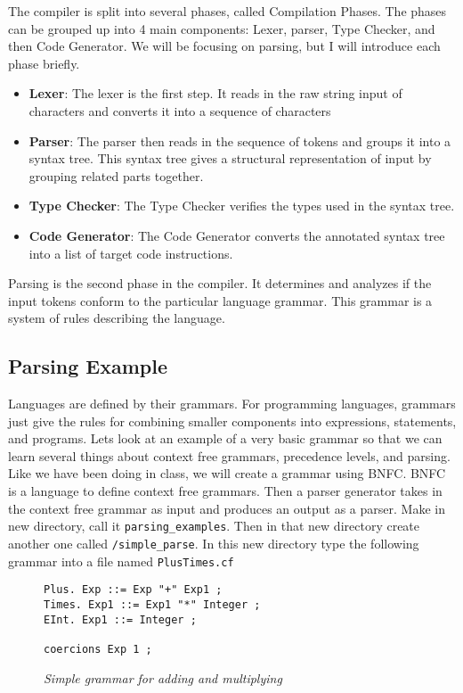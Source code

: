 \documentclass{article}
\begin{document}
\medskip\noindent
The compiler is split into several phases, called Compilation Phases. The phases can be grouped up into 4 main components: Lexer, parser, Type Checker, and then Code Generator. We will be focusing on parsing, but I will introduce each phase briefly.
\begin{itemize}
    \item \textbf{Lexer}: The lexer is the first step. It reads in the raw string input of characters and converts it into a sequence of characters
    \item \textbf{Parser}: The parser then reads in the sequence of tokens and groups it into a syntax tree. This syntax tree gives a structural representation of input by grouping related parts together.
    \item \textbf{Type Checker}: The Type Checker verifies the types used in the syntax tree. 
    \item \textbf{Code Generator}: The Code Generator converts the annotated syntax tree into a list of target code instructions\cite{IPL}.

\end{itemize}

\medskip\noindent
Parsing is the second phase in the compiler. It determines and analyzes if the input tokens conform to the particular language grammar. This grammar is a system of rules describing the language.

\subsection{Parsing Example}
Languages are defined by their grammars. For programming languages, grammars just give the rules for combining smaller components into expressions, statements, and programs. Lets look at an example of a very basic grammar so that we can learn several things about context free grammars, precedence levels, and parsing. Like we have been doing in class, we will create a grammar using BNFC. BNFC is a language to define context free grammars. Then a parser generator takes in the context free grammar as input and produces an output as a parser. Make in new directory, call it  \texttt{parsing\_examples}. Then in that new directory create another one called \texttt{/simple\_parse}. In this new directory type the following grammar into a file named \texttt{PlusTimes.cf}

\begin{figure}[H]
    \begin{lstlisting}
Plus. Exp ::= Exp "+" Exp1 ;
Times. Exp1 ::= Exp1 "*" Integer ;
EInt. Exp1 ::= Integer ;

coercions Exp 1 ;
    \end{lstlisting}
    \caption{\textit{Simple grammar for adding and multiplying}}
\end{figure}
\end{document}
